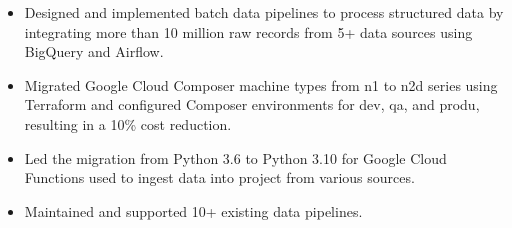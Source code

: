 \documentclass[10pt,a4paper,ragged2e]{altacv}
\begin{document}

\begin{fullwidth}
\makecvheader
\end{fullwidth}



\smallskip
{}
\begin{itemize}
\item Designed and implemented batch data pipelines to process structured data by integrating more than 10 million raw records from 5+ data sources using BigQuery and Airflow.
\item Migrated Google Cloud Composer machine types from n1 to n2d series using Terraform and configured Composer environments for dev, qa, and produ, resulting in a 10\% cost reduction.
\item Led the migration from Python 3.6 to Python 3.10 for Google Cloud Functions used to ingest data into project from various sources.
\item Maintained and supported 10+ existing data pipelines.
\smallskip
\end{itemize}

\divider
\end{document}
